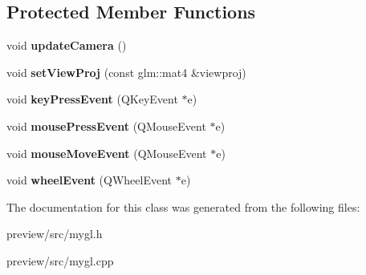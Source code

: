 \subsection*{Protected Member Functions}
\begin{DoxyCompactItemize}
\item 
\hypertarget{class_my_g_l_aeedc90ceca802a45f0f1996bf7c41fdf}{}void {\bfseries update\+Camera} ()\label{class_my_g_l_aeedc90ceca802a45f0f1996bf7c41fdf}

\item 
\hypertarget{class_my_g_l_aa8ba50d87d575ba097eba80770790e28}{}void {\bfseries set\+View\+Proj} (const glm\+::mat4 \&viewproj)\label{class_my_g_l_aa8ba50d87d575ba097eba80770790e28}

\item 
\hypertarget{class_my_g_l_aa1630b0a340a088139ffe429b583a993}{}void {\bfseries key\+Press\+Event} (Q\+Key\+Event $\ast$e)\label{class_my_g_l_aa1630b0a340a088139ffe429b583a993}

\item 
\hypertarget{class_my_g_l_aa682b04dfa5fed0e899e9a65dc55a27f}{}void {\bfseries mouse\+Press\+Event} (Q\+Mouse\+Event $\ast$e)\label{class_my_g_l_aa682b04dfa5fed0e899e9a65dc55a27f}

\item 
\hypertarget{class_my_g_l_a55149d95be75efb39706f9ca911b4535}{}void {\bfseries mouse\+Move\+Event} (Q\+Mouse\+Event $\ast$e)\label{class_my_g_l_a55149d95be75efb39706f9ca911b4535}

\item 
\hypertarget{class_my_g_l_ad9606a91a4d893fbfe285e32a1552af8}{}void {\bfseries wheel\+Event} (Q\+Wheel\+Event $\ast$e)\label{class_my_g_l_ad9606a91a4d893fbfe285e32a1552af8}

\end{DoxyCompactItemize}


The documentation for this class was generated from the following files\+:\begin{DoxyCompactItemize}
\item 
preview/src/mygl.\+h\item 
preview/src/mygl.\+cpp\end{DoxyCompactItemize}
